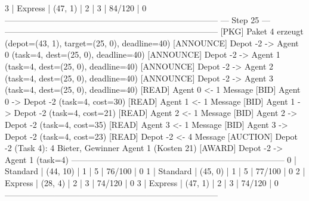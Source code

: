  3     | Express   | (47, 1)     | 2       | 3          | 84/120    | 0
-----------------------------------------------------------------------------
                               --- Step 25 ---
-----------------------------------------------------------------------------
[PKG]      Paket 4 erzeugt (depot=(43, 1), target=(25, 0), deadline=40)
[ANNOUNCE] Depot -2 -> Agent 0 (task=4, dest=(25, 0), deadline=40)
[ANNOUNCE] Depot -2 -> Agent 1 (task=4, dest=(25, 0), deadline=40)
[ANNOUNCE] Depot -2 -> Agent 2 (task=4, dest=(25, 0), deadline=40)
[ANNOUNCE] Depot -2 -> Agent 3 (task=4, dest=(25, 0), deadline=40)
[READ]    Agent 0 <- 1 Message
[BID]      Agent 0 -> Depot -2 (task=4, cost=30)
[READ]    Agent 1 <- 1 Message
[BID]      Agent 1 -> Depot -2 (task=4, cost=21)
[READ]    Agent 2 <- 1 Message
[BID]      Agent 2 -> Depot -2 (task=4, cost=35)
[READ]    Agent 3 <- 1 Message
[BID]      Agent 3 -> Depot -2 (task=4, cost=23)
[READ]    Depot -2 <- 4 Message
[AUCTION] Depot -2 (Task 4): 4 Bieter, Gewinner Agent 1 (Kosten 21)
[AWARD]    Depot -2 -> Agent 1 (task=4)
-----------------------------------------------------------------------------
 0     | Standard  | (44, 10)    | 1       | 5          | 76/100    | 0
 1     | Standard  | (45, 0)     | 1       | 5          | 77/100    | 0
 2     | Express   | (28, 4)     | 2       | 3          | 74/120    | 0
 3     | Express   | (47, 1)     | 2       | 3          | 74/120    | 0
-----------------------------------------------------------------------------